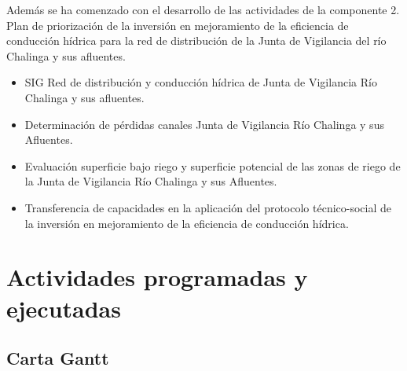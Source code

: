 \documentclass[]{article}
\begin{document}
Además se ha comenzado con el desarrollo de las actividades de la componente 2. Plan de priorización de la inversión en mejoramiento de la eficiencia de conducción hídrica para la red de distribución de la Junta de Vigilancia del río Chalinga y sus afluentes.

\begin{itemize}
\item SIG Red de distribución y conducción hídrica de Junta de Vigilancia Río Chalinga y sus afluentes.
\item Determinación de pérdidas canales Junta de Vigilancia Río Chalinga y sus Afluentes.
\item Evaluación superficie bajo riego y superficie potencial de las zonas de riego de la Junta de Vigilancia Río Chalinga y sus Afluentes.
\item Transferencia de capacidades en la aplicación del protocolo técnico-social de la inversión en mejoramiento de la eficiencia de conducción hídrica.
\end{itemize}

\clearpage
\section{Actividades programadas y ejecutadas}

\subsection{Carta Gantt}
\end{document}
